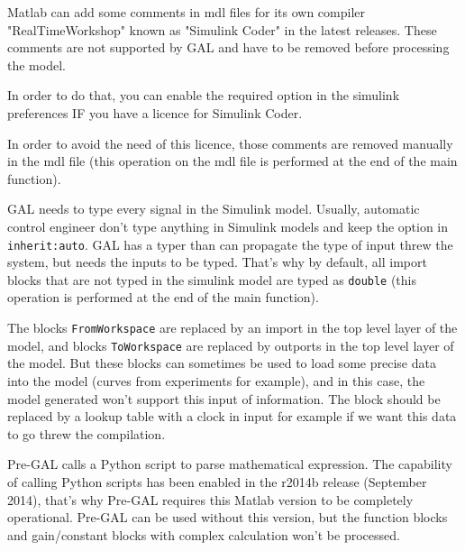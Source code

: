 \documentclass[a4paper,12pt]{article}
\begin{document}
Matlab can add some comments in mdl files for its own compiler "RealTimeWorkshop" known as "Simulink Coder" in the latest releases. These comments are not supported by GAL and have to be removed before processing the model.

In order to do that, you can enable the required option in the simulink preferences IF you have a licence for Simulink Coder.

In order to avoid the need of this licence, those comments are removed manually in the mdl file (this operation on the mdl file is performed at the end of the main function). \newline

GAL needs to type every signal in the Simulink model. Usually, automatic control engineer don't type anything in Simulink models and keep the option in \texttt{inherit:auto}. GAL has a typer than can propagate the type of input threw the system, but needs the inputs to be typed. That's why by default, all import blocks that are not typed in the simulink model are typed as \texttt{double} (this operation is performed at the end of the main function). \newline

The blocks \texttt{FromWorkspace} are replaced by an import in the top level layer of the model, and blocks \texttt{ToWorkspace} are replaced by outports in the top level layer of the model. But these blocks can sometimes be used to load some precise data into the model (curves from experiments for example), and in this case, the model generated won't support this input of information. The block should be replaced by a lookup table with a clock in input for example if we want this data to go threw the compilation. \newline

Pre-GAL calls a Python script to parse mathematical expression. The capability of calling Python scripts has been enabled in the r2014b release (September 2014), that's why Pre-GAL requires this Matlab version to be completely operational. Pre-GAL can be used without this version, but the function blocks and gain/constant blocks with complex calculation won't be processed.
\end{document}
